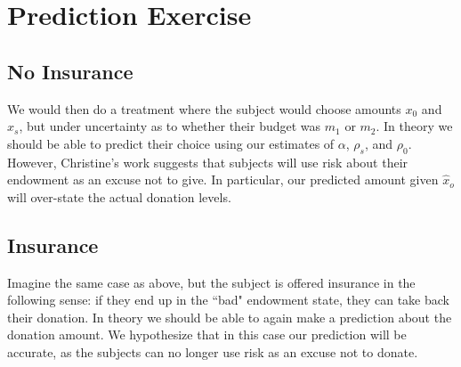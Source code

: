 \documentclass[11pt]{article}
\begin{document}
\section{Prediction Exercise}

\subsection{No Insurance}

We would then do a treatment where the subject would choose amounts $x_0$ and $x_s$, but under uncertainty as to whether their budget was $m_1$ or $m_2$.  In theory we should be able to predict their choice using our estimates of $\alpha$, $\rho_s$, and $\rho_0$.  However, Christine's work suggests that subjects will use risk about their endowment as an excuse not to give.  In particular, our predicted amount given $\hat x_o$ will over-state the actual donation levels.

\subsection{Insurance}

Imagine the same case as above, but the subject is offered insurance in the following sense: if they end up in the ``bad" endowment state, they can take back their donation.  In theory we should be able to again make a prediction about the donation amount.  We hypothesize that in this case our prediction will be accurate, as the subjects can no longer use risk as an excuse not to donate.
\end{document}
